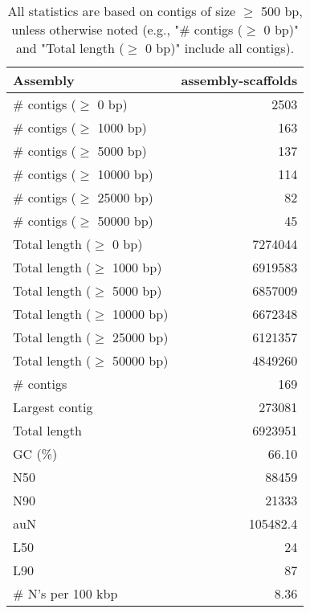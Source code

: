 \documentclass[12pt,a4paper]{article}
\begin{document}
\begin{table}[ht]
\begin{center}
\caption{All statistics are based on contigs of size $\geq$ 500 bp, unless otherwise noted (e.g., "\# contigs ($\geq$ 0 bp)" and "Total length ($\geq$ 0 bp)" include all contigs).}
\begin{tabular}{|l*{1}{|r}|}
\hline
Assembly & assembly-scaffolds \\ \hline
\# contigs ($\geq$ 0 bp) & 2503 \\ \hline
\# contigs ($\geq$ 1000 bp) & 163 \\ \hline
\# contigs ($\geq$ 5000 bp) & 137 \\ \hline
\# contigs ($\geq$ 10000 bp) & 114 \\ \hline
\# contigs ($\geq$ 25000 bp) & 82 \\ \hline
\# contigs ($\geq$ 50000 bp) & 45 \\ \hline
Total length ($\geq$ 0 bp) & 7274044 \\ \hline
Total length ($\geq$ 1000 bp) & 6919583 \\ \hline
Total length ($\geq$ 5000 bp) & 6857009 \\ \hline
Total length ($\geq$ 10000 bp) & 6672348 \\ \hline
Total length ($\geq$ 25000 bp) & 6121357 \\ \hline
Total length ($\geq$ 50000 bp) & 4849260 \\ \hline
\# contigs & 169 \\ \hline
Largest contig & 273081 \\ \hline
Total length & 6923951 \\ \hline
GC (\%) & 66.10 \\ \hline
N50 & 88459 \\ \hline
N90 & 21333 \\ \hline
auN & 105482.4 \\ \hline
L50 & 24 \\ \hline
L90 & 87 \\ \hline
\# N's per 100 kbp & 8.36 \\ \hline
\end{tabular}
\end{center}
\end{table}
\end{document}
